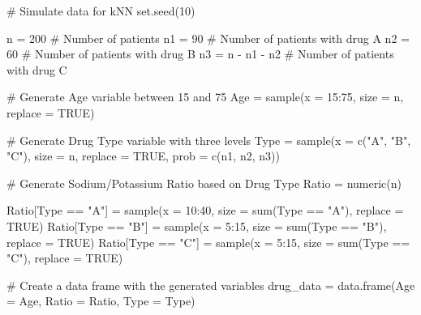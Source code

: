 \documentclass[
  11pt,
]{book}
\makeatletter
\newenvironment{Shaded}{}{}
\newcommand{\AttributeTok}[1]{#1}
\newcommand{\CommentTok}[1]{\textcolor[rgb]{0.36,0.36,0.36}{#1}}
\newcommand{\ConstantTok}[1]{#1}
\newcommand{\DecValTok}[1]{#1}
\newcommand{\FunctionTok}[1]{#1}
\newcommand{\NormalTok}[1]{#1}
\newcommand{\OtherTok}[1]{\textcolor[rgb]{0.39,0.39,0.39}{#1}}
\newcommand{\SpecialCharTok}[1]{\textcolor[rgb]{0.39,0.39,0.39}{#1}}
\newcommand{\StringTok}[1]{\textcolor[rgb]{0.39,0.39,0.39}{#1}}
\newenvironment{kframe}{%
\medskip{}
\setlength{\fboxsep}{.8em}
 \def\at@end@of@kframe{}%
 \ifinner\ifhmode%
  \def\at@end@of@kframe{\end{minipage}}%
  \begin{minipage}{\columnwidth}%
 \fi\fi%
 \def\FrameCommand##1{\hskip\@totalleftmargin \hskip-\fboxsep
 \colorbox{shadecolor}{##1}\hskip-\fboxsep
     \hskip-\linewidth \hskip-\@totalleftmargin \hskip\columnwidth}%
 \MakeFramed {\advance\hsize-\width
   \@totalleftmargin\z@ \linewidth\hsize
   \@setminipage}}%
 {\par\unskip\endMakeFramed%
 \at@end@of@kframe}
\renewenvironment{Shaded}{\begin{kframe}}{\end{kframe}}
\theoremstyle{definition}
\theoremstyle{definition}
\theoremstyle{definition}
\theoremstyle{definition}
\theoremstyle{remark}
\makeatother
\begin{document}
\begin{Shaded}
\begin{Highlighting}[]
\CommentTok{\# Simulate data for kNN}
\FunctionTok{set.seed}\NormalTok{(}\DecValTok{10}\NormalTok{)}

\NormalTok{n  }\OtherTok{=} \DecValTok{200}         \CommentTok{\# Number of patients}
\NormalTok{n1 }\OtherTok{=} \DecValTok{90}          \CommentTok{\# Number of patients with drug A}
\NormalTok{n2 }\OtherTok{=} \DecValTok{60}          \CommentTok{\# Number of patients with drug B }
\NormalTok{n3 }\OtherTok{=}\NormalTok{ n }\SpecialCharTok{{-}}\NormalTok{ n1 }\SpecialCharTok{{-}}\NormalTok{ n2 }\CommentTok{\# Number of patients with drug C}

\CommentTok{\# Generate Age variable between 15 and 75}
\NormalTok{Age }\OtherTok{=} \FunctionTok{sample}\NormalTok{(}\AttributeTok{x =} \DecValTok{15}\SpecialCharTok{:}\DecValTok{75}\NormalTok{, }\AttributeTok{size =}\NormalTok{ n, }\AttributeTok{replace =} \ConstantTok{TRUE}\NormalTok{)}

\CommentTok{\# Generate Drug Type variable with three levels}
\NormalTok{Type }\OtherTok{=} \FunctionTok{sample}\NormalTok{(}\AttributeTok{x =} \FunctionTok{c}\NormalTok{(}\StringTok{"A"}\NormalTok{, }\StringTok{"B"}\NormalTok{, }\StringTok{"C"}\NormalTok{), }\AttributeTok{size =}\NormalTok{ n, }\AttributeTok{replace =} \ConstantTok{TRUE}\NormalTok{, }\AttributeTok{prob =} \FunctionTok{c}\NormalTok{(n1, n2, n3))}

\CommentTok{\# Generate Sodium/Potassium Ratio based on Drug Type}
\NormalTok{Ratio }\OtherTok{=} \FunctionTok{numeric}\NormalTok{(n)}

\NormalTok{Ratio[Type }\SpecialCharTok{==} \StringTok{"A"}\NormalTok{] }\OtherTok{=} \FunctionTok{sample}\NormalTok{(}\AttributeTok{x =} \DecValTok{10}\SpecialCharTok{:}\DecValTok{40}\NormalTok{, }\AttributeTok{size =} \FunctionTok{sum}\NormalTok{(Type }\SpecialCharTok{==} \StringTok{"A"}\NormalTok{), }\AttributeTok{replace =} \ConstantTok{TRUE}\NormalTok{)}
\NormalTok{Ratio[Type }\SpecialCharTok{==} \StringTok{"B"}\NormalTok{] }\OtherTok{=} \FunctionTok{sample}\NormalTok{(}\AttributeTok{x =}  \DecValTok{5}\SpecialCharTok{:}\DecValTok{15}\NormalTok{, }\AttributeTok{size =} \FunctionTok{sum}\NormalTok{(Type }\SpecialCharTok{==} \StringTok{"B"}\NormalTok{), }\AttributeTok{replace =} \ConstantTok{TRUE}\NormalTok{)}
\NormalTok{Ratio[Type }\SpecialCharTok{==} \StringTok{"C"}\NormalTok{] }\OtherTok{=} \FunctionTok{sample}\NormalTok{(}\AttributeTok{x =}  \DecValTok{5}\SpecialCharTok{:}\DecValTok{15}\NormalTok{, }\AttributeTok{size =} \FunctionTok{sum}\NormalTok{(Type }\SpecialCharTok{==} \StringTok{"C"}\NormalTok{), }\AttributeTok{replace =} \ConstantTok{TRUE}\NormalTok{)}

\CommentTok{\# Create a data frame with the generated variables}
\NormalTok{drug\_data }\OtherTok{=} \FunctionTok{data.frame}\NormalTok{(}\AttributeTok{Age =}\NormalTok{ Age, }\AttributeTok{Ratio =}\NormalTok{ Ratio, }\AttributeTok{Type =}\NormalTok{ Type)}
\end{Highlighting}
\end{Shaded}
\end{document}
